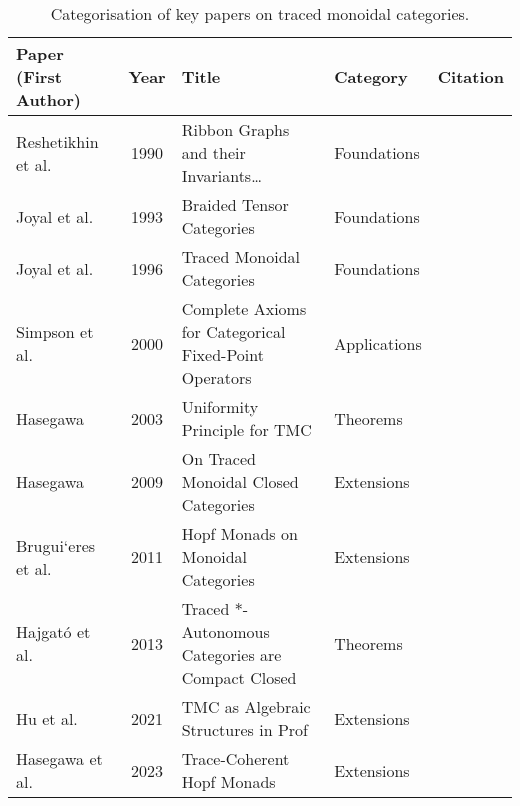 \begin{table}[h]
	\centering
	\begin{tabular}{|l|c|l|l|l|}
		\hline
		\textbf{Paper (First Author)} & \textbf{Year} & \textbf{Title}                                        & \textbf{Category} & \textbf{Citation}                               \\
		\hline
		Reshetikhin et al.            & 1990          & Ribbon Graphs and their Invariants\ldots              & Foundations       & \cite{reshetikhin1990-ribbon-graphs-invaraints} \\
		Joyal et al.                  & 1993          & Braided Tensor Categories                             & Foundations       & \cite{joyal1993-braided-tensor-categories}      \\
		Joyal et al.                  & 1996          & Traced Monoidal Categories                            & Foundations       & \cite{joyal1996-traced-monoidal-categories}     \\
		Simpson et al.                & 2000          & Complete Axioms for Categorical Fixed-Point Operators & Applications      & \cite{simpson2000-complete-axioms-categorical}  \\
		Hasegawa                      & 2003          & Uniformity Principle for TMC                          & Theorems          & \cite{hasegawa2003-uniformity-principle-traced} \\
		Hasegawa                      & 2009          & On Traced Monoidal Closed Categories                  & Extensions        & \cite{hasegawa2009-traced-monoidal-closed}      \\
		Brugui`eres et al.            & 2011          & Hopf Monads on Monoidal Categories                    & Extensions        & \cite{bruguieres2011-hopf-monads-monoidal}      \\
		Hajgat\'o et al.              & 2013          & Traced $*$-Autonomous Categories are Compact Closed   & Theorems          & \cite{hajgato2013-traced-autonomous-categories} \\
		Hu et al.                     & 2021          & TMC as Algebraic Structures in Prof                   & Extensions        & \cite{hu2021-traced-monoidal-categories}        \\
		Hasegawa et al.               & 2023          & Trace-Coherent Hopf Monads                            & Extensions        & \cite{hasegawa2023-traced-monads-hopf}          \\
		\hline
	\end{tabular}
	\caption{Categorisation of key papers on traced monoidal categories.}
\end{table}
